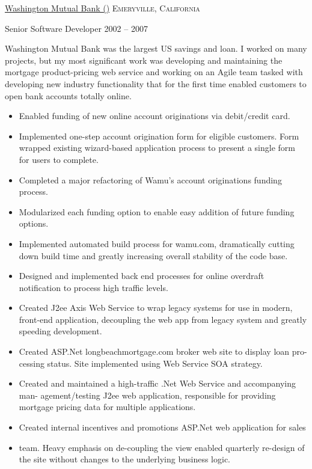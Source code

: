 \documentclass[10pt,a4paper]{article}
\begin{document}
\headedsection
  {\href{https://en.wikipedia.org/wiki/Washington_Mutual}{Washington Mutual Bank ()}}
  {\textsc{Emeryville, California}}
  {
  \headedsubsection
    {Senior Software Developer}
    {2002 -- 2007}
    {\bodytext
      {
        Washington Mutual Bank was the largest US savings and loan. I worked on many projects, but my most significant work was developing and maintaining the mortgage product-pricing web service and working on an Agile team tasked with developing new industry functionality that for the first time enabled customers to open bank accounts totally online.
        \begin{itemize}
          \item Enabled funding of new online account originations via debit/credit card.
          \item Implemented one-step account origination form for eligible customers. Form wrapped existing wizard-based application process to present a single form for users to complete.
          \item Completed a major refactoring of Wamu’s account originations funding process.
          \item Modularized each funding option to enable easy addition of future funding options.
          \item Implemented automated build process for wamu.com, dramatically cutting down build time and greatly increasing overall stability of the code base.
          \item Designed and implemented back end processes for online overdraft notification to process high traffic levels.
          \item Created J2ee Axis Web Service to wrap legacy systems for use in modern, front-end application, decoupling the web app from legacy system and greatly speeding development.
          \item Created ASP.Net longbeachmortgage.com broker web site to display loan pro-cessing status. Site implemented using Web Service SOA strategy.
          \item Created and maintained a high-traffic .Net Web Service and accompanying man- agement/testing J2ee web application, responsible for providing mortgage pricing data for multiple applications.
          \item Created internal incentives and promotions ASP.Net web application for sales
          \item team. Heavy emphasis on de-coupling the view enabled quarterly re-design of the site without changes to the underlying business logic.
        \end{itemize}
      }

    }
  }
\end{document}
